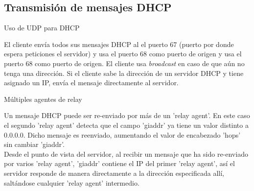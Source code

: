 \subsection{Transmisión de mensajes DHCP} %


\begin{frame}[fragile]{Uso de UDP para DHCP}

    El cliente envía todos sus mensajes DHCP al el puerto 67 (puerto por donde
    espera peticiones el servidor) y usa el puerto 68 como puerto de origen y
    usa el puerto 68 como puerto de origen. El cliente usa \textit{broadcast} en caso
    de que aún no tenga una dirección. Si el cliente sabe la dirección de un
    servidor DHCP y tiene asignado un IP, envía el mensaje directamente al
    servidor.\\[0.2cm]

\end{frame}

\begin{frame}[fragile]{Múltiples agentes de relay}

    Un mensaje DHCP puede ser re-enviado por más de un 'relay agent'. En este
    caso el segundo 'relay agent' detecta que el campo 'giaddr' ya tiene un
    valor distinto a 0.0.0.0. Dicho mensaje es reenviado, aumentando el valor
    de encabezado 'hops' sin cambiar 'giaddr'.\\[0.2cm]

    Desde el punto de vista del servidor, al recibir un mensaje que ha sido
    re-enviado por varios 'relay agent', 'giaddr' contiene el IP del primer
    'relay agent', así el servidor responde de manera directamente a la
    dirección especificada allí, saltándose cualquier 'relay agent'
    intermedio.\\[0.2cm]

\end{frame}

